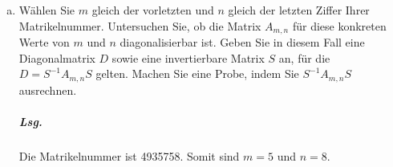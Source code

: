 \documentclass{scrreprt}
\begin{document}
\begin{enumerate}[(a)]
\begin{itemize}
  \item[$n = 1$:] $\text{Eig}\qty\big(A_{0, 0}, \lambda_2) = \qty{
      \begin{pmatrix}
        x_1 \\
        x_2 \\
        x_2 \\
      \end{pmatrix}
      \:\middle|\:
      x_1, x_2 \in \mathbb{R}
    } = \text{Span}\qty{
      \begin{pmatrix}
        1 \\
        0 \\
        0 \\
      \end{pmatrix}, \begin{pmatrix}
        0 \\
        1 \\
        1 \\
      \end{pmatrix}
    }$
  \item[$n \notin \qty\big{0, 1}$:]
    $\text{Eig}\qty\big(A_{0, 0}, \lambda_2) = \qty{
      \begin{pmatrix}
        0  \\
        x_2 \\
        x_2 \\
      \end{pmatrix}
      \:\middle|\:
      x_2 \in \mathbb{R}
    } = \text{Span}\qty{
      \begin{pmatrix}
        0 \\
        1 \\
        1 \\
      \end{pmatrix}
    }$
  \end{itemize}

\newpage
\item Wählen Sie $m$ gleich der vorletzten und $n$ gleich der letzten Ziffer
  Ihrer Matrikelnummer.
  Untersuchen Sie, ob die Matrix $A_{m, n}$ für diese konkreten Werte von $m$ und
  $n$ diagonalisierbar ist.
  Geben Sie in diesem Fall eine Diagonalmatrix $D$ sowie eine invertierbare Matrix
  $S$ an, für die $D = S^{-1}A_{m, n}S$ gelten.
  Machen Sie eine Probe, indem Sie $S^{-1}A_{m, n}S$ ausrechnen.

  \subparagraph{Lsg.} Die Matrikelnummer ist 4935758.
  Somit sind $m = 5$ und $n = 8$.


\end{enumerate}
\end{document}

